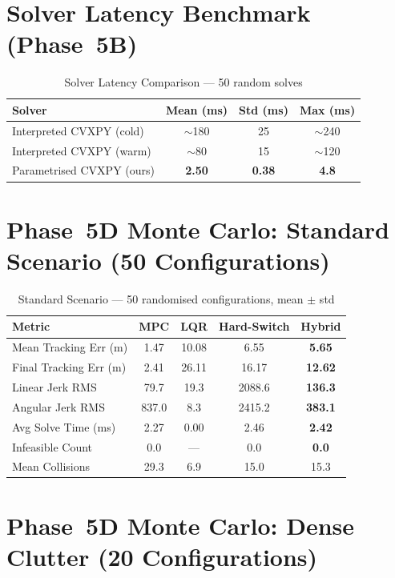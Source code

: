 \documentclass[12pt,a4paper,oneside]{report}
\begin{document}
\section{Solver Latency Benchmark (Phase~5B)}

\begin{table}[!ht]
\centering
\caption{Solver Latency Comparison — 50 random solves}
\label{tab:latency}
\begin{tabular}{lccc}
\toprule
Solver & Mean (ms) & Std (ms) & Max (ms) \\
\midrule
Interpreted CVXPY (cold) & $\sim$180 & 25 & $\sim$240 \\
Interpreted CVXPY (warm) & $\sim$80 & 15 & $\sim$120 \\
Parametrised CVXPY (ours) & \textbf{2.50} & \textbf{0.38} & \textbf{4.8} \\
\bottomrule
\end{tabular}
\end{table}

\section{Phase~5D Monte Carlo: Standard Scenario (50 Configurations)}

\begin{table}[!ht]
\centering
\caption{Standard Scenario — 50 randomised configurations, mean $\pm$ std}
\label{tab:random50}
\begin{tabular}{lcccc}
\toprule
Metric & MPC & LQR & Hard-Switch & \textbf{Hybrid} \\
\midrule
Mean Tracking Err (m) & 1.47 & 10.08 & 6.55 & \textbf{5.65} \\
Final Tracking Err (m) & 2.41 & 26.11 & 16.17 & \textbf{12.62} \\
Linear Jerk RMS & 79.7 & 19.3 & 2088.6 & \textbf{136.3} \\
Angular Jerk RMS & 837.0 & 8.3 & 2415.2 & \textbf{383.1} \\
Avg Solve Time (ms) & 2.27 & 0.00 & 2.46 & \textbf{2.42} \\
Infeasible Count & 0.0 & --- & 0.0 & \textbf{0.0} \\
Mean Collisions & 29.3 & 6.9 & 15.0 & 15.3 \\
\bottomrule
\end{tabular}
\end{table}

\section{Phase~5D Monte Carlo: Dense Clutter (20 Configurations)}
\end{document}
